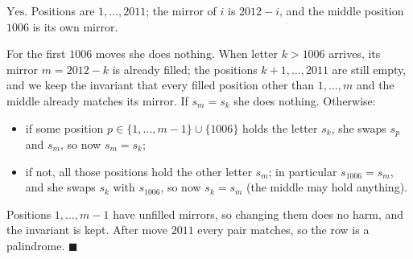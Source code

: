$\boxed{\text{Yes}}$. Positions are $1,\dots,2011$; the mirror of $i$ is $2012-i$, and the middle position $1006$ is its own mirror.

For the first $1006$ moves she does nothing. When letter $k>1006$ arrives, its mirror $m=2012-k$ is already filled; the positions $k+1,\dots,2011$ are still empty, and we keep the invariant that every filled position other than $1,\dots,m$ and the middle already matches its mirror. If $s_m=s_k$ she does nothing. Otherwise:
\begin{itemize}
\item if some position $p\in\{1,\dots,m-1\}\cup\{1006\}$ holds the letter $s_k$, she swaps $s_p$ and $s_m$, so now $s_m=s_k$;
\item if not, all those positions hold the other letter $s_m$; in particular $s_{1006}=s_m$, and she swaps $s_k$ with $s_{1006}$, so now $s_k=s_m$ (the middle may hold anything).
\end{itemize}
Positions $1,\dots,m-1$ have unfilled mirrors, so changing them does no harm, and the invariant is kept. After move $2011$ every pair matches, so the row is a palindrome. $\blacksquare$
